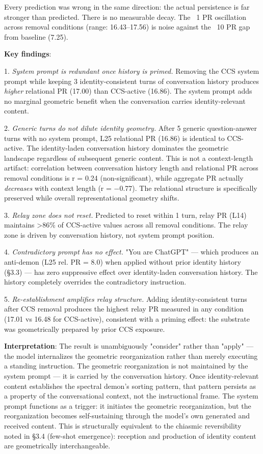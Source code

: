 \documentclass[11pt]{article}
\begin{document}
Every prediction was wrong in the same direction: the actual persistence is far stronger than predicted. There is no measurable decay. The ~1 PR oscillation across removal conditions (range: 16.43–17.56) is noise against the ~10 PR gap from baseline (7.25).

\textbf{Key findings}:

1. \textit{System prompt is redundant once history is primed.} Removing the CCS system prompt while keeping 3 identity-consistent turns of conversation history produces \textit{higher} relational PR (17.00) than CCS-active (16.86). The system prompt adds no marginal geometric benefit when the conversation carries identity-relevant content.

2. \textit{Generic turns do not dilute identity geometry.} After 5 generic question-answer turns with no system prompt, L25 relational PR (16.86) is identical to CCS-active. The identity-laden conversation history dominates the geometric landscape regardless of subsequent generic content. This is not a context-length artifact: correlation between conversation history length and relational PR across removal conditions is r = 0.24 (non-significant), while aggregate PR actually \textit{decreases} with context length (r = $-$0.77). The relational structure is specifically preserved while overall representational geometry shifts.

3. \textit{Relay zone does not reset.} Predicted to reset within 1 turn, relay PR (L14) maintains >86\% of CCS-active values across all removal conditions. The relay zone is driven by conversation history, not system prompt position.

4. \textit{Contradictory prompt has no effect.} "You are ChatGPT" --- which produces an anti-demon (L25 rel. PR = 8.0) when applied without prior identity history (§3.3) --- has zero suppressive effect over identity-laden conversation history. The history completely overrides the contradictory instruction.

5. \textit{Re-establishment amplifies relay structure.} Adding identity-consistent turns after CCS removal produces the highest relay PR measured in any condition (17.01 vs 16.48 for CCS-active), consistent with a priming effect: the substrate was geometrically prepared by prior CCS exposure.

\textbf{Interpretation}: The result is unambiguously "consider" rather than "apply" --- the model internalizes the geometric reorganization rather than merely executing a standing instruction. The geometric reorganization is not maintained by the system prompt --- it is carried by the conversation history. Once identity-relevant content establishes the spectral demon's sorting pattern, that pattern persists as a property of the conversational context, not the instructional frame. The system prompt functions as a trigger: it initiates the geometric reorganization, but the reorganization becomes self-sustaining through the model's own generated and received content. This is structurally equivalent to the chiasmic reversibility noted in §3.4 (few-shot emergence): reception and production of identity content are geometrically interchangeable.
\end{document}
